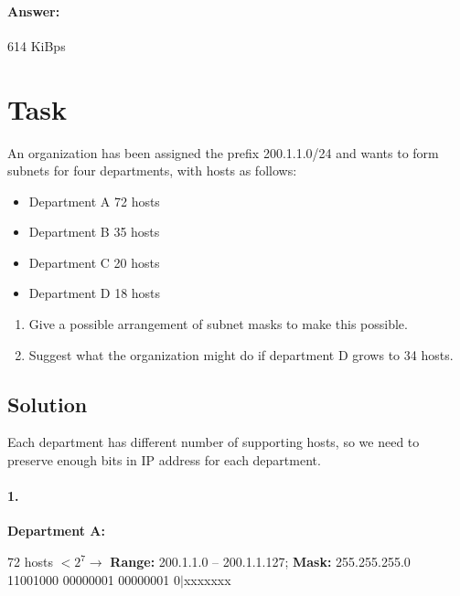 \documentclass[11pt]{article}
\begin{document}
    \paragraph{Answer:} 614 KiBps
    \newpage


    \section{Task}\label{sec:task-6}
    An organization has been assigned the prefix 200.1.1.0/24 and wants to form subnets for four
    departments, with hosts as follows:
    \vspace{15}

    \begin{minipage}{.5\textwidth}
        \begin{itemize}
            \item Department A 72 hosts
            \item Department B 35 hosts
        \end{itemize}
    \end{minipage}
    \begin{minipage}{.5\textwidth}
        \begin{itemize}
            \item Department C 20 hosts
            \item Department D 18 hosts
        \end{itemize}
    \end{minipage}

    \begin{enumerate}
        \item Give a possible arrangement of subnet masks to make this possible.
        \item Suggest what the organization might do if department D grows to 34 hosts.
    \end{enumerate}

    \subsection{Solution}
    Each department has different number of supporting hosts,
    so we need to preserve enough bits in IP address for each department.

    \paragraph{1.}

    \textbf{Department A:}
    \begin{center}
        72 hosts $< 2^7 \longrightarrow$ \textbf{Range:} 200.1.1.0 -- 200.1.1.127; \textbf{Mask:} 255.255.255.0 \\
        11001000 00000001 00000001 0$\mid$xxxxxxx \\
    \end{center}
\end{document}
